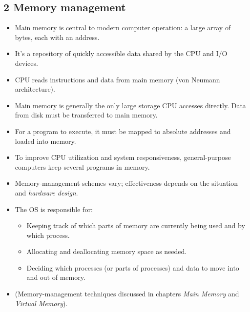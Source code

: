 \documentclass{article}
\begin{document}
\subsection*{2 Memory management}
\begin{itemize}
    \item Main memory is central to modern computer operation: a large array of bytes, each with an address.
    \item It's a repository of quickly accessible data shared by the CPU and I/O devices.
    \item CPU reads instructions and data from main memory (von Neumann architecture).
    \item Main memory is generally the only large storage CPU accesses directly. Data from disk must be transferred to main memory.
    \item For a program to execute, it must be mapped to absolute addresses and loaded into memory.
    \item To improve CPU utilization and system responsiveness, general-purpose computers keep several programs in memory.
    \item Memory-management schemes vary; effectiveness depends on the situation and \textit{hardware design}.
    \item The OS is responsible for:
    \begin{itemize}
        \item Keeping track of which parts of memory are currently being used and by which process.
        \item Allocating and deallocating memory space as needed.
        \item Deciding which processes (or parts of processes) and data to move into and out of memory.
    \end{itemize}
    \item (Memory-management techniques discussed in chapters \textit{Main Memory} and \textit{Virtual Memory}).
\end{itemize}
\end{document}
